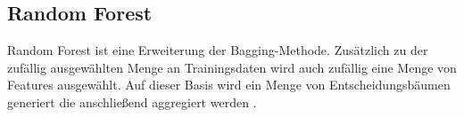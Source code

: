 \subsection{Random Forest}
Random Forest ist eine Erweiterung der Bagging-Methode. Zusätzlich zu der zufällig ausgewählten Menge an Trainingsdaten wird auch zufällig eine Menge von Features ausgewählt. Auf dieser Basis wird ein Menge von
Entscheidungsbäumen generiert die anschließend aggregiert werden \cite{breiman2001random}.
